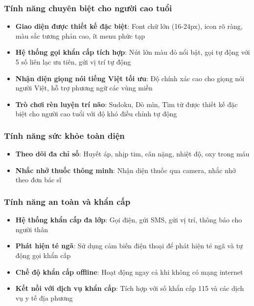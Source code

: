 \documentclass[12pt,a4paper]{article}
\begin{document}
\subsubsection{Tính năng chuyên biệt cho người cao tuổi}
\begin{itemize}[leftmargin=2cm]
    \item \textbf{Giao diện được thiết kế đặc biệt}: Font chữ lớn (16-24px), icon rõ ràng, màu sắc tương phản cao, ít menu phức tạp
    \item \textbf{Hệ thống gọi khẩn cấp tích hợp}: Nút lớn màu đỏ nổi bật, gọi tự động với 5 số liên lạc ưu tiên, gửi vị trí tự động
    \item \textbf{Nhận diện giọng nói tiếng Việt tối ưu}: Độ chính xác cao cho giọng nói người Việt, hỗ trợ phương ngữ các vùng miền
    \item \textbf{Trò chơi rèn luyện trí não}: Sudoku, Dò mìn, Tìm từ được thiết kế đặc biệt cho người cao tuổi với độ khó điều chỉnh tự động
\end{itemize}



\subsubsection{Tính năng sức khỏe toàn diện}
\begin{itemize}[leftmargin=2cm]
    \item \textbf{Theo dõi đa chỉ số}: Huyết áp, nhịp tim, cân nặng, nhiệt độ, oxy trong máu
    \item \textbf{Nhắc nhở thuốc thông minh}: Nhận diện thuốc qua camera, nhắc nhở theo đơn bác sĩ
\end{itemize}

\subsubsection{Tính năng an toàn và khẩn cấp}
\begin{itemize}[leftmargin=2cm]
    \item \textbf{Hệ thống khẩn cấp đa lớp}: Gọi điện, gửi SMS, gửi vị trí, thông báo cho người thân
    \item \textbf{Phát hiện té ngã}: Sử dụng cảm biến điện thoại để phát hiện té ngã và tự động gọi khẩn cấp
    \item \textbf{Chế độ khẩn cấp offline}: Hoạt động ngay cả khi không có mạng internet
    \item \textbf{Kết nối với dịch vụ khẩn cấp}: Tích hợp với số khẩn cấp 115 và các dịch vụ y tế địa phương
\end{itemize}
\end{document}
